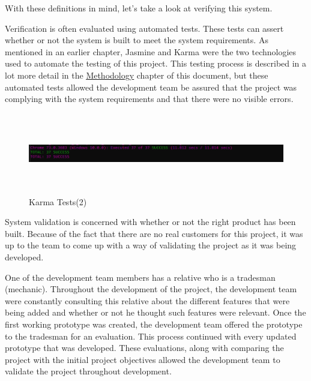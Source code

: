\bigskip

With these definitions in mind, let's take a look at verifying this system. 

Verification is often evaluated using automated tests. These tests can assert whether or not the system is built to meet the system requirements. As mentioned in an earlier chapter, Jasmine and Karma were the two technologies used to automate the testing of this project. This testing process is described in a lot more detail in the \hyperref[sec:MethodologyTesting]{\underline{Methodology}} chapter of this document, but these automated tests allowed the development team be assured that the project was complying with the system requirements and that there were no visible errors.



\begin{figure}[H]
    \centering
    \includegraphics[width=\textwidth, height=100pt]{img/KarmaTests2.PNG}
    \caption{Karma Tests(2)}
    \label{fig:my_label}
\end{figure}

\bigskip

System validation is concerned with whether or not the right product has been built. Because of the fact that there are no real customers for this project, it was up to the team to come up with a way of validating the project as it was being developed. 

\bigskip

One of the development team members has a relative who is a tradesman (mechanic). Throughout the development of the project, the development team were constantly consulting this relative about the different features that were being added and whether or not he thought such features were relevant. Once the first working prototype was created, the development team offered the prototype to the tradesman for an evaluation. This process continued with every updated prototype that was developed. These evaluations, along with comparing the project with the initial project objectives allowed the development team to validate the project throughout development.

